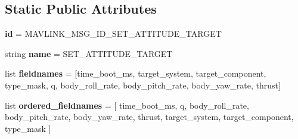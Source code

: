 \subsection*{Static Public Attributes}
\begin{DoxyCompactItemize}
\item 
\mbox{\label{classpymavlink_1_1dialects_1_1v10_1_1MAVLink__set__attitude__target__message_ab226722e40987b0eff8582bef8f703ce}} 
{\bfseries id} = M\+A\+V\+L\+I\+N\+K\+\_\+\+M\+S\+G\+\_\+\+I\+D\+\_\+\+S\+E\+T\+\_\+\+A\+T\+T\+I\+T\+U\+D\+E\+\_\+\+T\+A\+R\+G\+ET
\item 
\mbox{\label{classpymavlink_1_1dialects_1_1v10_1_1MAVLink__set__attitude__target__message_a667fb2e55848e2b8a00c73f9281247db}} 
string {\bfseries name} = \textquotesingle{}S\+E\+T\+\_\+\+A\+T\+T\+I\+T\+U\+D\+E\+\_\+\+T\+A\+R\+G\+ET\textquotesingle{}
\item 
\mbox{\label{classpymavlink_1_1dialects_1_1v10_1_1MAVLink__set__attitude__target__message_ac7cf997d15448a6906105ec34e5a29ec}} 
list {\bfseries fieldnames} = \mbox{[}\textquotesingle{}time\+\_\+boot\+\_\+ms\textquotesingle{}, \textquotesingle{}target\+\_\+system\textquotesingle{}, \textquotesingle{}target\+\_\+component\textquotesingle{}, \textquotesingle{}type\+\_\+mask\textquotesingle{}, \textquotesingle{}q\textquotesingle{}, \textquotesingle{}body\+\_\+roll\+\_\+rate\textquotesingle{}, \textquotesingle{}body\+\_\+pitch\+\_\+rate\textquotesingle{}, \textquotesingle{}body\+\_\+yaw\+\_\+rate\textquotesingle{}, \textquotesingle{}thrust\textquotesingle{}\mbox{]}
\item 
\mbox{\label{classpymavlink_1_1dialects_1_1v10_1_1MAVLink__set__attitude__target__message_add566453d9ff97efa69f575aeb80064a}} 
list {\bfseries ordered\+\_\+fieldnames} = \mbox{[} \textquotesingle{}time\+\_\+boot\+\_\+ms\textquotesingle{}, \textquotesingle{}q\textquotesingle{}, \textquotesingle{}body\+\_\+roll\+\_\+rate\textquotesingle{}, \textquotesingle{}body\+\_\+pitch\+\_\+rate\textquotesingle{}, \textquotesingle{}body\+\_\+yaw\+\_\+rate\textquotesingle{}, \textquotesingle{}thrust\textquotesingle{}, \textquotesingle{}target\+\_\+system\textquotesingle{}, \textquotesingle{}target\+\_\+component\textquotesingle{}, \textquotesingle{}type\+\_\+mask\textquotesingle{} \mbox{]}

\end{DoxyCompactItemize}
